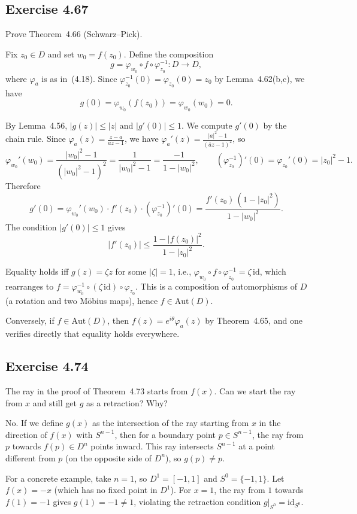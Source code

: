 \documentclass{article}
\begin{document}
\subsection{Exercise 4.67}

Prove Theorem~4.66 (Schwarz--Pick).

\begin{solution}
  Fix $z_0 \in D$ and set $w_0 = f(z_0)$. Define the composition
  \[
    g = \varphi_{w_0} \circ f \circ \varphi_{z_0}^{-1} : D \to D,
  \]
  where $\varphi_a$ is as in~(4.18). Since $\varphi_{z_0}^{-1}(0) =
  \varphi_{z_0}(0) = z_0$ by Lemma~4.62(b,c), we have
  \[
    g(0) = \varphi_{w_0}(f(z_0)) = \varphi_{w_0}(w_0) = 0.
  \]

  By Lemma~4.56, $|g(z)| \le |z|$ and $|g'(0)| \le 1$. We compute
  $g'(0)$ by the chain rule. Since
  $\varphi_a(z) = \frac{z - a}{\bar{a}z - 1}$, we have
  $\varphi_a'(z) = \frac{|a|^2 - 1}{(\bar{a}z - 1)^2}$, so
  \[
    \varphi_{w_0}'(w_0) = \frac{|w_0|^2 - 1}{(|w_0|^2 - 1)^2}
    = \frac{1}{|w_0|^2 - 1} = \frac{-1}{1 - |w_0|^2},
    \qquad
    (\varphi_{z_0}^{-1})'(0) = \varphi_{z_0}'(0) = |z_0|^2 - 1.
  \]
  Therefore
  \[
    g'(0) = \varphi_{w_0}'(w_0) \cdot f'(z_0) \cdot
    (\varphi_{z_0}^{-1})'(0)
    = \frac{f'(z_0)\,(1 - |z_0|^2)}{1 - |w_0|^2}.
  \]
  The condition $|g'(0)| \le 1$ gives
  \[
    |f'(z_0)| \le \frac{1 - |f(z_0)|^2}{1 - |z_0|^2}.
  \]

  Equality holds iff $g(z) = \zeta z$ for some $|\zeta| = 1$, i.e.,
  $\varphi_{w_0} \circ f \circ \varphi_{z_0}^{-1} = \zeta \,\mathrm{id}$,
  which rearranges to
  $f = \varphi_{w_0}^{-1} \circ (\zeta\,\mathrm{id}) \circ \varphi_{z_0}$.
  This is a composition of automorphisms of $D$ (a rotation and two
  M\"obius maps), hence $f \in \mathrm{Aut}(D)$.

  Conversely, if $f \in \mathrm{Aut}(D)$, then
  $f(z) = e^{i\theta}\varphi_a(z)$ by Theorem~4.65, and one verifies
  directly that equality holds everywhere.
\end{solution}

\subsection{Exercise 4.74}

The ray in the proof of Theorem~4.73 starts from $f(x)$. Can we start
the ray from $x$ and still get $g$ as a retraction? Why?

\begin{solution}
  No. If we define $g(x)$ as the intersection of the ray starting from
  $x$ in the direction of $f(x)$ with $S^{n-1}$, then for a boundary
  point $p \in S^{n-1}$, the ray from $p$ towards $f(p) \in D^n$
  points inward. This ray intersects $S^{n-1}$ at a point different
  from $p$ (on the opposite side of $D^n$), so $g(p) \ne p$.

  For a concrete example, take $n = 1$, so $D^1 = [-1,1]$ and
  $S^0 = \{-1, 1\}$. Let $f(x) = -x$ (which has no fixed point in
  $D^1$). For $x = 1$, the ray from $1$ towards $f(1) = -1$ gives
  $g(1) = -1 \ne 1$, violating the retraction condition
  $g|_{S^0} = \mathrm{id}_{S^0}$.
\end{solution}
\end{document}
